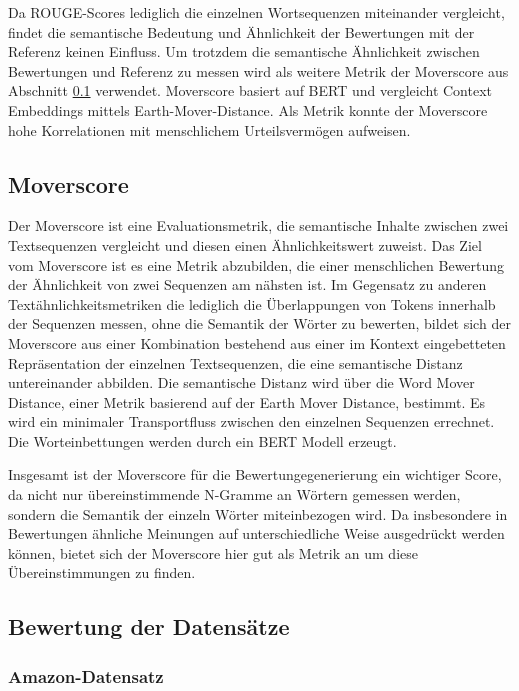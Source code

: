 Da ROUGE-Scores lediglich die einzelnen Wortsequenzen miteinander vergleicht, findet die semantische Bedeutung und Ähnlichkeit der Bewertungen mit der Referenz keinen Einfluss.
Um trotzdem die semantische Ähnlichkeit zwischen Bewertungen und Referenz zu messen wird als weitere Metrik der Moverscore aus Abschnitt \ref{moverscore} verwendet.
Moverscore basiert auf BERT und vergleicht Context Embeddings mittels Earth-Mover-Distance. Als Metrik konnte der Moverscore hohe Korrelationen mit menschlichem Urteilsvermögen aufweisen.


\subsection{Moverscore}
\label{moverscore}
Der Moverscore \citep{moverscore_paper} ist eine Evaluationsmetrik, die semantische Inhalte zwischen zwei Textsequenzen vergleicht und diesen einen Ähnlichkeitswert zuweist.
Das Ziel vom Moverscore ist es eine Metrik abzubilden, die einer menschlichen Bewertung der Ähnlichkeit von zwei Sequenzen am nähsten ist. 
Im Gegensatz zu anderen Textähnlichkeitsmetriken die lediglich die Überlappungen von Tokens innerhalb der Sequenzen messen, ohne die Semantik der Wörter zu bewerten, 
bildet sich der Moverscore aus einer Kombination bestehend aus einer im Kontext eingebetteten Repräsentation der einzelnen Textsequenzen, die eine semantische Distanz untereinander abbilden.
Die semantische Distanz wird über die Word Mover Distance, einer Metrik basierend auf der Earth Mover Distance, bestimmt. Es wird ein minimaler Transportfluss zwischen den einzelnen Sequenzen errechnet.
Die Worteinbettungen werden durch ein BERT Modell erzeugt.

Insgesamt ist der Moverscore für die Bewertungegenerierung ein wichtiger Score, da nicht nur übereinstimmende N-Gramme an Wörtern gemessen werden, sondern die Semantik der einzeln Wörter miteinbezogen wird. 
Da insbesondere in Bewertungen ähnliche Meinungen auf unterschiedliche Weise ausgedrückt werden können, bietet sich der Moverscore hier gut als Metrik an um diese Übereinstimmungen zu finden.


\subsection{Bewertung der Datensätze}

\subsubsection{Amazon-Datensatz}

